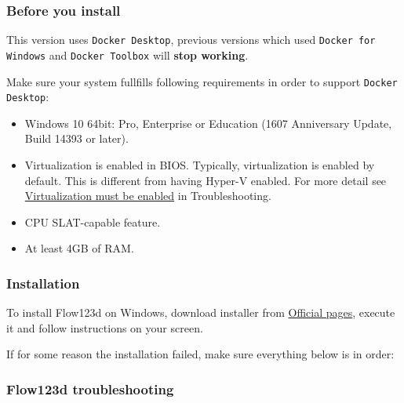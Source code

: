 \subsubsection{Before you install}

This version uses \verb'Docker Desktop', previous versions which used \verb'Docker for Windows' and \verb'Docker Toolbox' will \textbf{stop working}.

Make sure your system fullfills following requirements in order to support \verb'Docker Desktop':
\begin{itemize}
    \item Windows 10 64bit: Pro, Enterprise or Education (1607 Anniversary Update, Build 14393 or later).
    \item Virtualization is enabled in BIOS. Typically, virtualization is enabled by default. This is different from having Hyper-V enabled. For more detail see \href{https://docs.docker.com/docker-for-windows/troubleshoot/#virtualization-must-be-enabled}{Virtualization must be enabled} in Troubleshooting.
    \item CPU SLAT-capable feature.
    \item At least 4GB of RAM.
\end{itemize}


\subsubsection{Installation}

To install Flow123d on Windows, download installer from \href{http://flow123d.github.io/}{Official pages}, execute it and follow instructions
on your screen.


If for some reason the installation failed, make sure everything below is in order:


\subsubsection{Flow123d troubleshooting}


